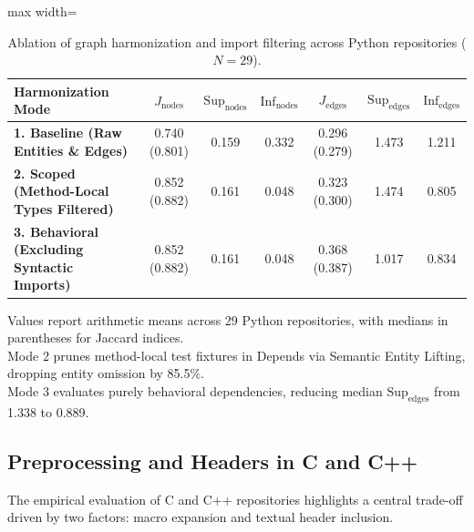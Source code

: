 \begin{table}[htpb]
  \centering
  \small
  \caption{Ablation of graph harmonization and import filtering
  across Python repositories ($N=29$).}
  \label{tab:python_harmonization_ablation}
  \vspace{0.4em}
  \begin{adjustbox}{max width=\textwidth}
    \begin{tabular}{lcccccc}
      \toprule
      \textbf{Harmonization Mode} & $J_{\text{nodes}}$ &
      $\text{Sup}_{\text{nodes}}$ & $\text{Inf}_{\text{nodes}}$ &
      $J_{\text{edges}}$ & $\text{Sup}_{\text{edges}}$ &
      $\text{Inf}_{\text{edges}}$ \\
      \midrule
      \textbf{1. Baseline (Raw Entities \& Edges)}          & 0.740
      (0.801) & 0.159 & 0.332 & 0.296 (0.279) & 1.473 & 1.211 \\
      \textbf{2. Scoped (Method-Local Types Filtered)}      & 0.852
      (0.882) & 0.161 & 0.048 & 0.323 (0.300) & 1.474 & 0.805 \\
      \textbf{3. Behavioral (Excluding Syntactic Imports)}  & 0.852
      (0.882) & 0.161 & 0.048 & 0.368 (0.387) & 1.017 & 0.834 \\
      \bottomrule
    \end{tabular}
  \end{adjustbox}
  \vspace{0.2em}
  \footnotesize
  Values report arithmetic means across 29 Python repositories, with
  medians in parentheses for Jaccard indices.\\
  Mode 2 prunes method-local test fixtures in Depends via Semantic
  Entity Lifting, dropping entity omission by 85.5\%.\\
  Mode 3 evaluates purely behavioral dependencies, reducing median
  $\text{Sup}_{\text{edges}}$ from 1.338 to 0.889.
\end{table}

\subsection{Preprocessing and Headers in C and C++}
\label{subsec:discussion_procedural_dilemma}

The empirical evaluation of C and C++ repositories highlights a central
trade-off driven by two factors: macro expansion and textual header inclusion.

